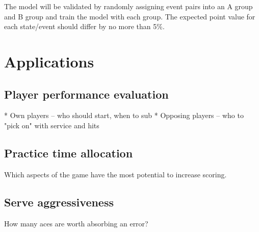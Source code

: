 \documentclass{IOS-Book-Article}
\begin{document}
The model will be validated by randomly assigning event pairs into an A group and B group and train 
the model with each group. The expected point value for each state/event should differ by no more 
than 5\%.

\section{Applications}

\subsection{Player performance evaluation}

* Own players -- who should start, when to sub
* Opposing players -- who to "pick on" with service and hits

\subsection{Practice time allocation}

Which aspects of the game have the most potential to increase scoring.

\subsection{Serve aggressiveness}

How many aces are worth absorbing an error?
\end{document}
